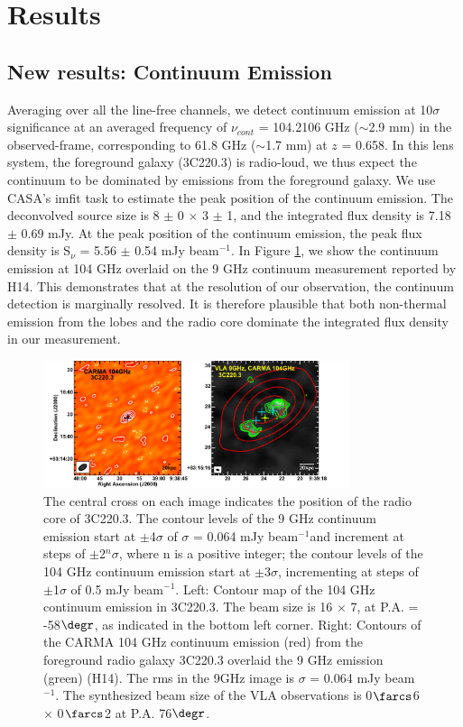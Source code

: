 \documentclass[twocolumn,apj,numberedappendix]{emulateapj}
\newcommand{\pmOne}{$^{-1}$}
\begin{document}
\section{Results}\label{sec:res}
\subsection{New results: Continuum Emission} 
Averaging over all the line-free channels, we detect continuum emission at 10$\sigma$ significance at an averaged frequency of $\nu_{cont}$ = 104.2106 GHz ($\sim$2.9 mm) in the observed-frame, corresponding to 61.8 GHz ($\sim$1.7 mm) at $z$ = 0.658. In this lens system, the 
foreground galaxy (3C220.3) is radio-loud, we thus expect the continuum to be dominated by emissions from the foreground galaxy. We use CASA's {\sc imfit} task to estimate the peak position of the continuum emission. The deconvolved source size is 8 $\pm$ 0 $\times$ 3 $\pm$ 1, and the integrated flux density is 7.18 $\pm$ 0.69 mJy. At the peak position of the continuum emission, the peak flux density is S$_\nu$ = 5.56 $\pm$ 0.54 
mJy beam\pmOne.
In Figure \ref{fig:cont}, we show the continuum emission at 104 GHz overlaid on the 9 GHz continuum measurement reported by H14. This demonstrates that at the resolution of our observation, the continuum detection is marginally resolved. It is therefore plausible that both non-thermal emission from the lobes and the radio core dominate the integrated flux density in our measurement.

\begin{figure}[tbph]
\centering
\includegraphics[width=0.80\textwidth]{Figure/ContPanel}
\caption{The central cross on each image indicates the position of the radio core of 3C220.3. The contour levels of the 9 GHz continuum 
emission start at $\pm$4$\sigma$ of $\sigma$ = 0.064 mJy beam\pmOne and increment at steps of $\pm$2$^n\sigma$, 
where n is a positive integer; the contour levels of the 104 GHz continuum emission start at $\pm$3$\sigma$, incrementing at steps 
of $\pm$1$\sigma$ of 0.5 mJy beam\pmOne.
Left: Contour map of the 104 GHz continuum emission in 3C220.3. The beam size is 16 $\times$ 7, at P.A. = 
-58$\degr$, as indicated in the bottom left corner. Right: Contours of the CARMA 104 GHz continuum emission (red) from the 
foreground radio galaxy 3C220.3 overlaid the 9 GHz emission (green) (H14). The rms in the 9GHz image is $\sigma$ 
= 0.064 mJy beam\pmOne. The synthesized beam size of the VLA observations is 0$\farcs$6 $\times$ 0$\farcs$2 at P.A. 
76$\degr$. 
\label{fig:cont}}
\end{figure}
\end{document}

